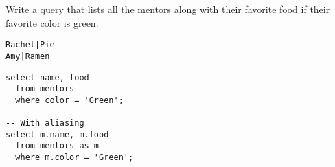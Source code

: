 \begin{blocksection}
\question Write a query that lists all the mentors along with their favorite food if their favorite color is green.

\begin{lstlisting}
Rachel|Pie
Amy|Ramen
\end{lstlisting}

\begin{solution}[1in]
\begin{lstlisting}
select name, food
  from mentors
  where color = 'Green';
  
-- With aliasing
select m.name, m.food
  from mentors as m
  where m.color = 'Green';
\end{lstlisting}
\end{solution}
\end{blocksection}

